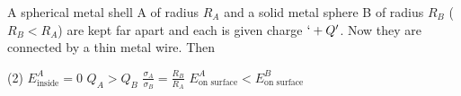 
\item A spherical metal shell A of radius $R_A$ and a solid metal sphere B of radius $R_B$ ($R_B < R_A$) are kept far apart and each is given charge $`+Q'$. Now they are connected by a thin metal wire. Then
    \begin{tasks}(2)
        \task $E_{\text{inside}}^A = 0$
        \task $Q_A > Q_B$
        \task $\frac{\sigma_A}{\sigma_B} = \frac{R_B}{R_A}$
        \task $E_{\text{on surface}}^A < E_{\text{on surface}}^B$
    \end{tasks}
